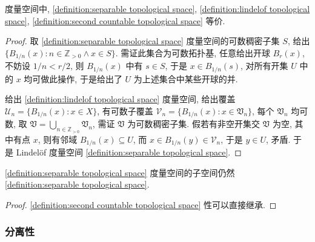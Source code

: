 \begin{lemma}
    度量空间中, \ref{definition:separable topological space}, \ref{definition:lindelof topological space}, \ref{definition:second countable topological space} 等价.

    \begin{proof}
        取 \ref{definition:separable topological space} 度量空间的可数稠密子集 \(S\), 给出 \(\{B_{1/n} (x) : n \in \mathbb{Z}_{> 0}\land x \in S\}\). 需证此集合为可数拓扑基,
        任意给出开球 \(B_r (x)\), 不妨设 \(1/n < r/2\), 则 \(B_{1/n} (x)\) 中有 \(s \in S\), 于是 \(x \in B_{1/n} (s)\),
        对所有开集 \(U\) 中的 \(x\) 均可做此操作, 于是给出了 \(U\) 为上述集合中某些开球的并.

        给出 \ref{definition:lindelof topological space} 度量空间, 给出覆盖 \(\mathcal{U}_n = \{B_{1/n} (x) : x \in X\}\), 有可数子覆盖 \(\mathcal{V}_n = \{B_{1/n} (x) : x \in \mathfrak{V}_n\}\),
        每个 \(\mathfrak{V}_n\) 均可数, 取 \(\mathfrak{V} = \bigcup_{n \in \mathbb{Z}_{> 0}} \mathfrak{V}_n\), 需证 \(\mathfrak{V}\) 为可数稠密子集.
        假若有非空开集交 \(\mathfrak{V}\) 为空, 其中有点 \(x\), 则有邻域 \(B_{1/n} (x) \subseteq U\), 而 \(x \in B_{1/n} (y) \in \mathcal{V}_n\),
        于是 \(y \in U\), 矛盾. 于是 Lindelöf 度量空间 \ref{definition:separable topological space}.
    \end{proof}
\end{lemma}

\begin{lemma}
    \ref{definition:separable topological space} 度量空间的子空间仍然 \ref{definition:separable topological space}.

    \begin{proof}
        \ref{definition:second countable topological space} 性可以直接继承.
    \end{proof}
\end{lemma}

\subsubsection{分离性}

